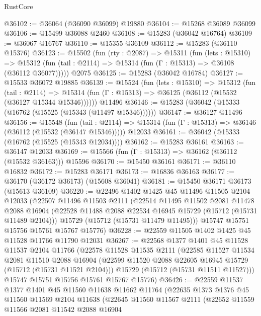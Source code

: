 \begin{lexlean}{RustCore}
\begin{coremodule}
@36102 := @36064 (@36090 @36099) @19880
@36104 := @15268 @36089 @36099
@36106 := @15499 @36088 @2460
@36108 := @15283 (@36042 @16764)
@36109 := @36067 @16767
@36110 := @15355 @36109
@36112 := @15283 (@36110 @15376)
@36123 := @15502
    (fun (rty : @2087) =>
    @15311
      (fun (lets : @15310) =>
      @15312 (fun (tail : @2114) => @15314 (fun (Γ : @15313) => @36108 (@36112 @36077)))))
    @2075
@36125 := @15283 (@36042 @16784)
@36127 := @15533 @36072 @19885
@36139 := @15524
    (fun (lets : @15310) =>
    @15312
      (fun (tail : @2114) =>
      @15314 (fun (Γ : @15313) => @36125 (@36112 (@15532 (@36127 @15344 @15346))))))
    @11496
@36146 := @15283 (@36042 (@15333 (@16762 (@15525 (@15343 (@11497 @15346))))))
@36147 := @36127 @11496
@36156 := @15548
    (fun (tail : @2114) => @15314 (fun (Γ : @15313) => @36146 (@36112 (@15532 (@36147 @15346)))))
    @12033
@36161 := @36042 (@15333 (@16762 (@15525 (@15343 @12034))))
@36162 := @15283 @36161
@36163 := @36147 @12033
@36169 := @15566 (fun (Γ : @15313) => @36162 (@36112 (@15532 @36163))) @15596
@36170 := @15450 @36161
@36171 := @36110 @16832
@36172 := @15283 @36171
@36173 := @16836 @36163
@36177 := @36170 (@36172 @36173) (@15608 @36041)
@36181 := @15450 @36171 @36173 (@15613 @36109)
@36220 := @22496
    @1402
    @1425
    @45
    @11496
    @11505
    @2104
    @12033
    (@22507
      @11496
      @11503
      @2111
      (@22514
        @11495
        @11502
        @2081
        @11478
        @2088
        @16904
        (@22528 @11488 @2088 @22534 @16945 @15729 (@15712 (@15731 @11489 @2104)))
        @15729
        (@15712 (@15731 @11479 @11495)))
      @15747
      @15751
      @15756
      @15761
      @15767
      @15776)
@36228 := @22559 @11505 @1402 @1425 @45 @11528 @11766 @11790 @12031
@36267 := @22568
    @1377
    @1401
    @45
    @11528
    @11537
    @2104
    @11766
    (@22578
      @11528
      @11535
      @2111
      (@22585
        @11527
        @11534
        @2081
        @11510
        @2088
        @16904
        (@22599 @11520 @2088 @22605 @16945 @15729 (@15712 (@15731 @11521 @2104)))
        @15729
        (@15712 (@15731 @11511 @11527)))
      @15747
      @15751
      @15756
      @15761
      @15767
      @15776)
@36426 := @22559
    @11537
    @1377
    @1401
    @45
    @11560
    @11638
    @11662
    @11764
    (@22635
      @1373
      @1376
      @45
      @11560
      @11569
      @2104
      @11638
      (@22645
        @11560
        @11567
        @2111
        (@22652
          @11559
          @11566
          @2081
          @11542
          @2088
          @16904

\end{coremodule}
\end{lexlean}
